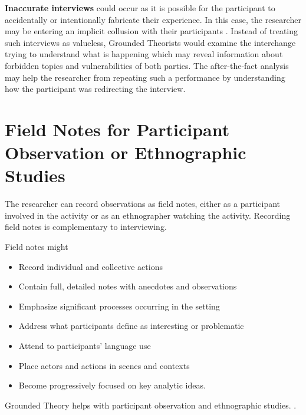 \textbf{Inaccurate interviews} could occur as it is possible for the participant to accidentally or intentionally fabricate their experience. In this case, the researcher may be entering an implicit collusion with their participants \cite{Yanos2008CollusiveObjectification}. Instead of treating such interviews as valueless, Grounded Theorists would examine the interchange trying to understand what is happening which may reveal information about forbidden topics and vulnerabilities of both parties. The after-the-fact analysis may help the researcher from repeating such a performance by understanding how the participant was redirecting the interview. 

\section{Field Notes for Participant Observation or Ethnographic Studies}
The researcher can record observations as field notes, either as a participant involved in the activity or as an ethnographer watching the activity. Recording field notes is complementary to interviewing. 

Field notes might
\begin{itemize}
\item Record individual and collective actions 
\item Contain full, detailed notes with anecdotes and observations 
\item Emphasize significant processes occurring in the setting 
\item Address what participants define as interesting or problematic 
\item Attend to participants' language use 
\item Place actors and actions in scenes and contexts 
\item Become progressively focused on key analytic ideas. \cite{Charmaz}
\end{itemize}

Grounded Theory helps with participant observation and ethnographic studies.  \cite{Charmaz}.

